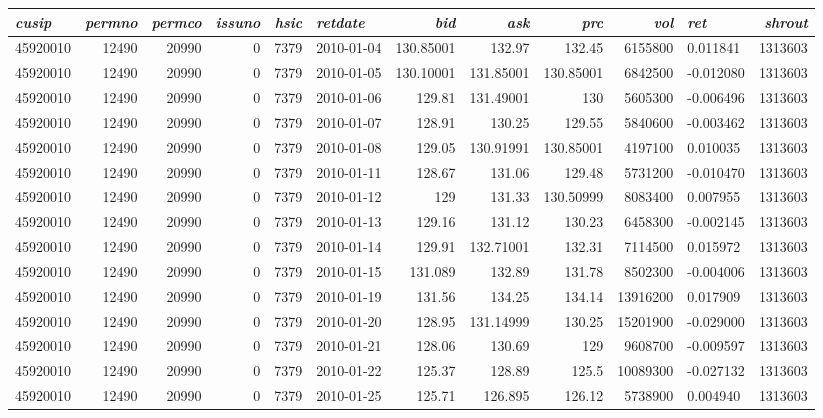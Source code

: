 \begin{tabular}{l | r | r | r | r | l | r | r | r | r | l | r}
\textit{cusip} & \textit{permno} & \textit{permco} & \textit{issuno} & \textit{hsic} & \textit{retdate} & \textit{bid} & \textit{ask} & \textit{prc} & \textit{vol} & \textit{ret} & \textit{shrout} \\
\hline
45920010 & 12490 & 20990 & 0 & 7379 & 2010-01-04 & 130.85001 & 132.97 & 132.45 & 6155800 & 0.011841 & 1313603 \\
45920010 & 12490 & 20990 & 0 & 7379 & 2010-01-05 & 130.10001 & 131.85001 & 130.85001 & 6842500 & -0.012080 & 1313603 \\
45920010 & 12490 & 20990 & 0 & 7379 & 2010-01-06 & 129.81 & 131.49001 & 130 & 5605300 & -0.006496 & 1313603 \\
45920010 & 12490 & 20990 & 0 & 7379 & 2010-01-07 & 128.91 & 130.25 & 129.55 & 5840600 & -0.003462 & 1313603 \\
45920010 & 12490 & 20990 & 0 & 7379 & 2010-01-08 & 129.05 & 130.91991 & 130.85001 & 4197100 & 0.010035 & 1313603 \\
45920010 & 12490 & 20990 & 0 & 7379 & 2010-01-11 & 128.67 & 131.06 & 129.48 & 5731200 & -0.010470 & 1313603 \\
45920010 & 12490 & 20990 & 0 & 7379 & 2010-01-12 & 129 & 131.33 & 130.50999 & 8083400 & 0.007955 & 1313603 \\
45920010 & 12490 & 20990 & 0 & 7379 & 2010-01-13 & 129.16 & 131.12 & 130.23 & 6458300 & -0.002145 & 1313603 \\
45920010 & 12490 & 20990 & 0 & 7379 & 2010-01-14 & 129.91 & 132.71001 & 132.31 & 7114500 & 0.015972 & 1313603 \\
45920010 & 12490 & 20990 & 0 & 7379 & 2010-01-15 & 131.089 & 132.89 & 131.78 & 8502300 & -0.004006 & 1313603 \\
45920010 & 12490 & 20990 & 0 & 7379 & 2010-01-19 & 131.56 & 134.25 & 134.14 & 13916200 & 0.017909 & 1313603 \\
45920010 & 12490 & 20990 & 0 & 7379 & 2010-01-20 & 128.95 & 131.14999 & 130.25 & 15201900 & -0.029000 & 1313603 \\
45920010 & 12490 & 20990 & 0 & 7379 & 2010-01-21 & 128.06 & 130.69 & 129 & 9608700 & -0.009597 & 1313603 \\
45920010 & 12490 & 20990 & 0 & 7379 & 2010-01-22 & 125.37 & 128.89 & 125.5 & 10089300 & -0.027132 & 1313603 \\
45920010 & 12490 & 20990 & 0 & 7379 & 2010-01-25 & 125.71 & 126.895 & 126.12 & 5738900 & 0.004940 & 1313603 \\

\end{tabular}
